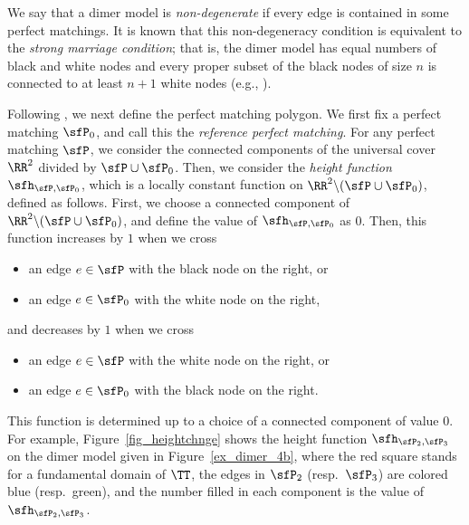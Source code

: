 We say that a dimer model is \emph{non-degenerate} if every edge is contained in some perfect matchings.
It is known that this non-degeneracy condition is equivalent to the \emph{strong marriage condition}; that is, the dimer model has equal numbers of black and white nodes and every proper subset of the black nodes of size $n$ is connected to at least $n+1$ white nodes (e.g., \cite[Remark~2.12]{Bro}).

Following \cite[Section~5]{IU2}, we next define the perfect matching polygon.
We first fix a perfect matching $\sfP_0$, and call this the \emph{reference perfect matching}.
For any perfect matching $\sfP$, we consider the connected components of the universal cover $\RR^2$ divided by $\sfP\cup\sfP_0$.
Then, we consider the \emph{height function} $\sfh_{\sfP,\sfP_0}$, which is a locally constant function on $\RR^2{\setminus}(\sfP\cup\sfP_0)$, defined as follows.
First, we choose a connected component of $\RR^2{\setminus}(\sfP\cup\sfP_0)$, and define the value of $\sfh_{\sfP,\sfP_0}$ as $0$.
Then, this function increases by $1$ when we cross
\begin{itemize}\itemsep=0pt
\item[--] an edge $e\in\sfP$ with the black node on the right, or
\item[--] an edge $e\in\sfP_0$ with the white node on the right,
\end{itemize}
and decreases by $1$
when we cross
\begin{itemize}\itemsep=0pt
\item[--] an edge $e\in\sfP$ with the white node on the right, or
\item[--] an edge $e\in\sfP_0$ with the black node on the right.
\end{itemize}
This function is determined up to a choice of a connected component of value $0$.
For example, Figure~\ref{fig_heightchnge} shows the height function $\sfh_{\sfP_2,\sfP_3}$ on the dimer model given in Figure~\ref{ex_dimer_4b},
where the red square stands for a fundamental domain of $\TT$, the edges in $\sfP_2$ (resp.~$\sfP_3$) are colored blue (resp.\ green),
and the number filled in each component is the value of $\sfh_{\sfP_2,\sfP_3}$.

